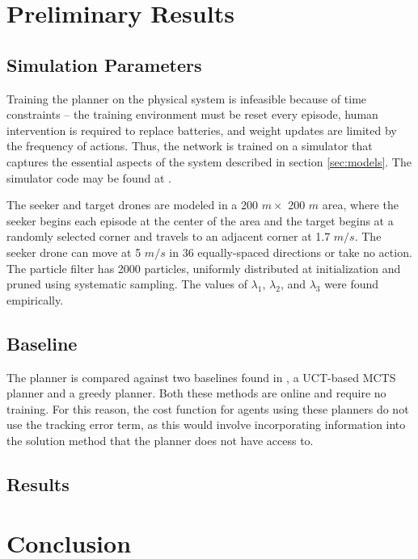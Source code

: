 \documentclass[10pt,twocolumn,letterpaper]{article}
\begin{document}
\section{Preliminary Results}

\subsection{Simulation Parameters}
Training the planner on the physical system is infeasible because of time constraints -- the training environment must be reset every episode, human intervention is required to replace batteries, and weight updates are limited by the frequency of actions.
Thus, the network is trained on a simulator that captures the essential aspects of the system described in section \ref{sec:models}.
The simulator code may be found at \cite{PyFEBOL}.

The seeker and target drones are modeled in a 200 $m \times$ 200 $m$ area, where the seeker begins each episode at the center of the area and the target begins at a randomly selected corner and travels to an adjacent corner at 1.7 $m/s$.
The seeker drone can move at 5 $m/s$ in 36 equally-spaced directions or take no action.
The particle filter has 2000 particles, uniformly distributed at initialization and pruned using systematic sampling.
The values of $\lambda_1$, $\lambda_2$, and $\lambda_3$ were found empirically.

\subsection{Baseline}
The planner is compared against two baselines found in \cite{dronehunter}, a UCT-based MCTS planner and a greedy planner.
Both these methods are online and require no training.
For this reason, the cost function for agents using these planners do not use the tracking error term, as this would involve incorporating information into the solution method that the planner does not have access to.

\subsection{Results}

\section{Conclusion}
\end{document}
